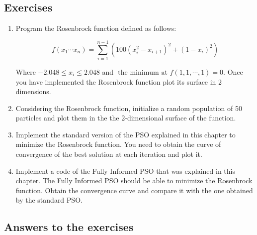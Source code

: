 \subsection{Exercises}
\label{sec:exeercises}

\begin{enumerate}
    \item Program the Rosenbrock function defined as follows:
    
    \begin{equation} \label{eq:rosen}
    f(x_1 \cdots x_n) = \sum_{i=1}^{n-1} (100(x_i^2 - x_{i+1})^2 + (1-x_i)^2)
\end{equation}

Where $-2.048 \leq x_i \leq 2.048$ and $\text{ the minimum at }f(1, 1, \cdots, 1) = 0$.  Once you have implemented the Rosenbrock function plot its surface in 2 dimensions.

    \item Considering the Rosenbrock function, initialize a random population of 50 particles and plot them in the the 2-dimensional surface of the function.
    
    \item Implement the standard version of the PSO explained in this chapter to minimize the Rosenbrock function. You need to obtain the curve of convergence of the best solution at each iteration and plot it.
    
    \item Implement a code of the Fully Informed PSO that was explained in this chapter. The Fully Informed PSO should be able to minimize the Rosenbrock function. Obtain the convergence curve and compare it with the one obtained by the standard PSO. 
    
\end{enumerate}

\subsection{Answers to the exercises}
\label{sec:answers}

